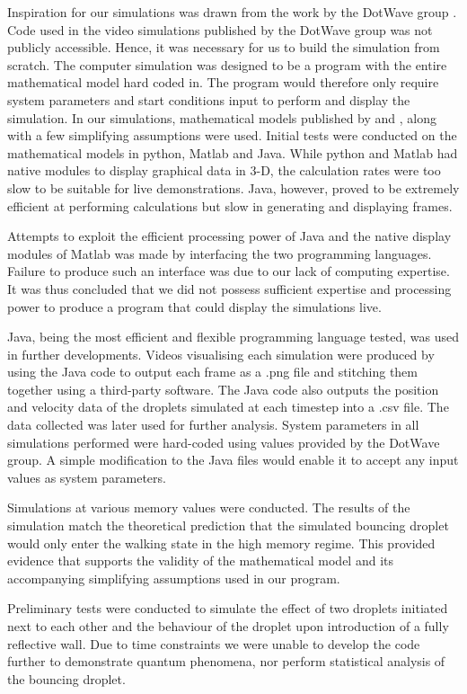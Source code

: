 Inspiration for our simulations was drawn from the work by the DotWave group \cite{dotwave}. Code used in the video simulations published by the DotWave group was not publicly accessible. Hence, it was necessary for us to build the simulation from scratch. The computer simulation was designed to be a program with the entire mathematical model hard coded in. The program would therefore only require system parameters and start conditions input to perform and display the simulation.
In our simulations, mathematical models published by \cite{oza2013trajectory} and \cite{brady2014bouncing}, along with a few simplifying assumptions were used. Initial tests were conducted on the mathematical models in python, Matlab and Java. While python and Matlab had native modules to display graphical data in 3-D, the calculation rates were too slow to be suitable for live demonstrations. Java, however, proved to be extremely efficient at performing calculations but slow in generating and displaying frames. 

Attempts to exploit the efficient processing power of Java and the native display modules of Matlab was made by interfacing the two programming languages. Failure to produce such an interface was due to our lack of computing expertise. It was thus concluded that we did not possess sufficient expertise and processing power to produce a program that could display the simulations live.

Java, being the most efficient and flexible programming language tested, was used in further developments. Videos visualising each simulation were produced by using the Java code to output each frame as a .png file and stitching them together using a third-party software. The Java code also outputs the position and velocity data of the droplets simulated at each timestep into a .csv file. The data collected was later used for further analysis. System parameters in all simulations performed were hard-coded using values provided by the DotWave group. A simple modification to the Java files would enable it to accept any input values as system parameters.

Simulations at various memory values were conducted. The results of the simulation match the theoretical prediction that the simulated bouncing droplet would only enter the walking state in the high memory regime. This provided evidence that supports the validity of the mathematical model and its accompanying simplifying assumptions used in our program.

Preliminary tests were conducted to simulate the effect of two droplets initiated next to each other and the behaviour of the droplet upon introduction of a fully reflective wall. Due to time constraints we were unable to develop the code further to demonstrate quantum phenomena, nor perform statistical analysis of the bouncing droplet. 
